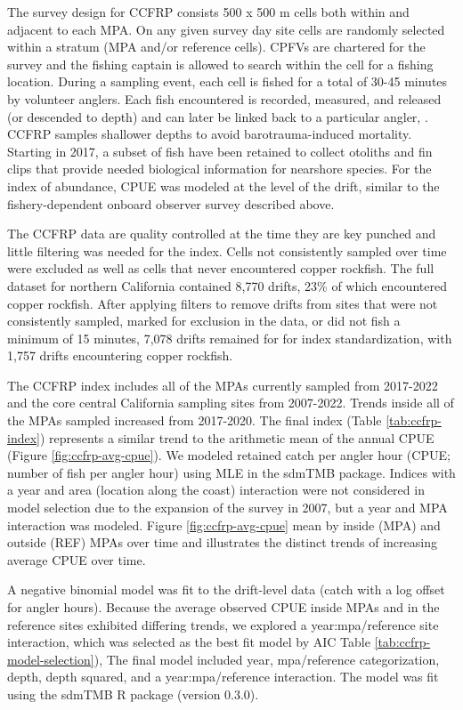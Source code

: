 \documentclass[11pt,
  english,
  letterpaper,
]{article}
\begin{document}
The survey design for CCFRP consists 500 x 500 m cells both within and adjacent to each MPA. On any given survey day site cells are randomly selected within a stratum (MPA and/or reference cells). CPFVs are chartered for the survey and the fishing captain is allowed to search within the cell for a fishing location. During a sampling event, each cell is fished for a total of 30-45 minutes by volunteer anglers. Each fish encountered is recorded, measured, and released (or descended to depth) and can later be linked back to a particular angler, . CCFRP samples shallower depths to avoid barotrauma-induced mortality.\\
Starting in 2017, a subset of fish have been retained to collect otoliths and fin clips that provide needed biological information for nearshore species. For the index of abundance, CPUE was modeled at the level of the drift, similar to the fishery-dependent onboard observer survey described above.

The CCFRP data are quality controlled at the time they are key punched and little filtering was needed for the index. Cells not consistently sampled over time were excluded as well as cells that never encountered copper rockfish. The full dataset for northern California contained 8,770 drifts, 23\% of which encountered copper rockfish. After applying filters to remove drifts from sites that were not consistently sampled, marked for exclusion in the data, or did not fish a minimum of 15 minutes, 7,078 drifts remained for for index standardization, with 1,757 drifts encountering copper rockfish.

The CCFRP index includes all of the MPAs currently sampled from 2017-2022 and the core central California sampling sites from 2007-2022. Trends inside all of the MPAs sampled increased from 2017-2020. The final index (Table \ref{tab:ccfrp-index}) represents a similar trend to the arithmetic mean of the annual CPUE (Figure \ref{fig:ccfrp-avg-cpue}). We modeled retained catch per angler hour (CPUE; number of fish per angler hour) using MLE in the sdmTMB package. Indices with a year and area (location along the coast) interaction were not considered in model selection due to the expansion of the survey in 2007, but a year and MPA interaction was modeled. Figure \ref{fig:ccfrp-avg-cpue} mean by inside (MPA) and outside (REF) MPAs over time and illustrates the distinct trends of increasing average CPUE over time.

A negative binomial model was fit to the drift-level data (catch with a log offset for angler hours). Because the average observed CPUE inside MPAs and in the reference sites exhibited differing trends, we explored a year:mpa/reference site interaction, which was selected as the best fit model by AIC Table \ref{tab:ccfrp-model-selection}), The final model included year, mpa/reference categorization, depth, depth squared, and a year:mpa/reference interaction. The model was fit using the sdmTMB R package (version 0.3.0).
\end{document}
